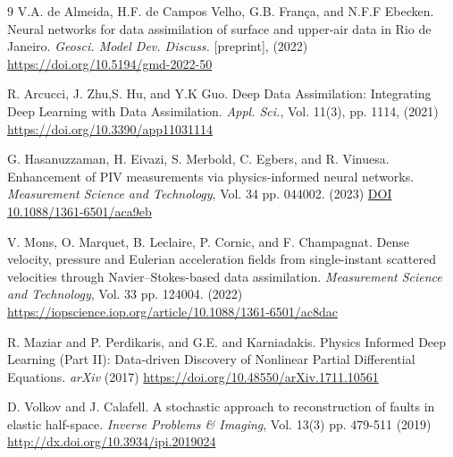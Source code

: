 \documentclass{article}
\begin{document}
\begin{thebibliography}{9}
 V.A. de Almeida, H.F. de Campos Velho, G.B. França, and N.F.F Ebecken. Neural networks for data assimilation of surface and upper-air data in Rio de Janeiro. {\it Geosci. Model Dev. Discuss.} [preprint], (2022) \href{https://doi.org/10.5194/gmd-2022-50}{https://doi.org/10.5194/gmd-2022-50} 

 R. Arcucci, J. Zhu,S. Hu, and Y.K Guo. Deep Data Assimilation: Integrating Deep Learning with Data Assimilation. {\it Appl. Sci.}, Vol. 11(3), pp. 1114, (2021) \href{https://doi.org/10.3390/app11031114}{https://doi.org/10.3390/app11031114}

 G. Hasanuzzaman, H. Eivazi, S. Merbold, C. Egbers, and R. Vinuesa. Enhancement of PIV measurements via physics-informed neural networks. {\it Measurement Science and Technology}, Vol. 34 pp. 044002. (2023) \href{https://iopscience.iop.org/article/10.1088/1361-6501/aca9eb}{DOI 10.1088/1361-6501/aca9eb}


 V. Mons, O. Marquet, B. Leclaire, P. Cornic, and F. Champagnat. Dense velocity, pressure and Eulerian acceleration fields from single-instant scattered velocities through Navier–Stokes-based data assimilation. {\it Measurement Science and Technology}, Vol. 33 pp. 124004. (2022) \href{https://iopscience.iop.org/article/10.1088/1361-6501/aca9eb}{https://iopscience.iop.org/article/10.1088/1361-6501/ac8dac}

 R. Maziar and P. Perdikaris, and G.E. and Karniadakis. Physics Informed Deep Learning (Part II): Data-driven Discovery of Nonlinear Partial Differential Equations. {\it arXiv} (2017) \href{https://doi.org/10.48550/arXiv.1711.10561}{https://doi.org/10.48550/arXiv.1711.10561}


D. Volkov and J. Calafell. A stochastic approach to reconstruction of faults in elastic half-space. {\it Inverse Problems \& Imaging}, Vol. 13(3) pp. 479-511 (2019) \href{http://dx.doi.org/10.3934/ipi.2019024}{http://dx.doi.org/10.3934/ipi.2019024} 



\end{thebibliography}
\end{document}

